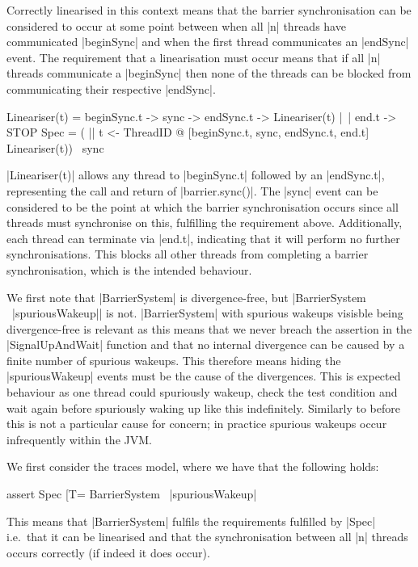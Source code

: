 Correctly linearised in this context means that the barrier synchronisation can be considered to occur at some point between when all |n| threads have communicated |beginSync| and when the first thread communicates an |endSync| event. The requirement that a linearisation must occur means that if all |n| threads communicate a |beginSync| then none of the threads can be blocked from communicating their respective |endSync|.

\begin{cspm}[caption={The lineariser specification for barrier synchronisations}]
Lineariser(t) = beginSync.t -> sync -> endSync.t -> Lineariser(t)
              |~| end.t -> STOP
Spec = ( || t <- ThreadID @ [{beginSync.t, sync, endSync.t, end.t}] 
              Lineariser(t)) \ {sync}
\end{cspm}

|Lineariser(t)| allows any thread to |beginSync.t| followed by an |endSync.t|, representing the call and return of |barrier.sync()|. The |sync| event can be considered to be the point at which the barrier synchronisation occurs since all threads must synchronise on this, fulfilling the requirement above. Additionally, each thread can terminate via |end.t|, indicating that it will perform no further synchronisations. This blocks all other threads from completing a barrier synchronisation, which is the intended behaviour.

We first note that |BarrierSystem| is divergence-free, but |BarrierSystem \ {|spuriousWakeup|}| is not. |BarrierSystem| with spurious wakeups visisble being divergence-free is relevant as this means that we never breach the assertion in the |SignalUpAndWait| function and that no internal divergence can be caused by a finite number of spurious wakeups. This therefore means hiding the |spuriousWakeup| events must be the cause of the divergences.
This is expected behaviour as one thread could spuriously wakeup, check the test condition and wait again before spuriously waking up like this indefinitely. Similarly to before this is not a particular cause for concern; in practice spurious wakeups occur infrequently within the JVM.

We first consider the traces model, where we have that the following holds:
\begin{cspm}
assert Spec [T= BarrierSystem \ {|spuriousWakeup|}
\end{cspm}
This means that |BarrierSystem| fulfils the requirements fulfilled by |Spec| i.e.~that it can be linearised and that the synchronisation between all |n| threads occurs correctly (if indeed it does occur).

